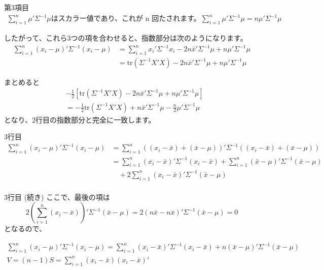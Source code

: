 \documentclass{beamer}
\begin{document}
\begin{frame}{第3項目}
\begin{align*}
\sum_{i=1}^n \mu'\Sigma^{-1}\mu\text{はスカラー値であり、これが n 回たされます。}
\sum_{i=1}^n \mu'\Sigma^{-1}\mu 
= n\mu'\Sigma^{-1}\mu
\end{align*}

したがって、これら3つの項を合わせると、指数部分は次のようになります。
\begin{align*}
\sum_{i=1}^n (x_i - \mu)'\Sigma^{-1}(x_i - \mu)
&= \sum_{i=1}^n x_i'\Sigma^{-1}x_i - 2n\bar{x}'\Sigma^{-1}\mu + n\mu'\Sigma^{-1}\mu \\
&= \mathrm{tr}(\Sigma^{-1} X'X) - 2n\bar{x}'\Sigma^{-1}\mu + n\mu'\Sigma^{-1}\mu
\end{align*}

\end{frame}

\begin{frame}{まとめると}
    \begin{align*}
    & -\frac{1}{2} \left[ \mathrm{tr}(\Sigma^{-1} X'X) - 2n\bar{x}'\Sigma^{-1}\mu + n\mu'\Sigma^{-1}\mu \right] \\
    &= -\frac{1}{2} \mathrm{tr}(\Sigma^{-1} X'X) + n\bar{x}'\Sigma^{-1}\mu - \frac{n}{2} \mu'\Sigma^{-1}\mu
    \end{align*}
    となり、2行目の指数部分と完全に一致します。
\end{frame}

\begin{frame}{3行目}
\begin{align*}
\sum_{i=1}^n (x_i - \mu)' \Sigma^{-1} (x_i - \mu)
&= \sum_{i=1}^n \left( (x_i - \bar{x}) + (\bar{x} - \mu) \right)' \Sigma^{-1} \left( (x_i - \bar{x}) + (\bar{x} - \mu) \right) \\
&= \sum_{i=1}^n (x_i - \bar{x})' \Sigma^{-1} (x_i - \bar{x}) + \sum_{i=1}^n (\bar{x} - \mu)' \Sigma^{-1} (\bar{x} - \mu) \\
&\quad + 2\sum_{i=1}^n (x_i - \bar{x})' \Sigma^{-1} (\bar{x} - \mu)\\
\end{align*}
\end{frame}

\begin{frame}{3行目 (続き)}
ここで、最後の項は
\[
2\left(\sum_{i=1}^n (x_i - \bar{x})\right)' \Sigma^{-1} (\bar{x} - \mu) = 2(n\bar{x} - n\bar{x})' \Sigma^{-1} (\bar{x} - \mu) = 0
\]
となるので、

\begin{align*}
\sum_{i=1}^n (x_i - \mu)' \Sigma^{-1} (x_i - \mu)
= \sum_{i=1}^n (x_i - \bar{x})' \Sigma^{-1} (x_i - \bar{x}) + n(\bar{x} - \mu)' \Sigma^{-1} (\bar{x} - \mu)\\
V = (n-1)S = \sum_{i=1}^n (x_i - \bar{x})(x_i - \bar{x})'
\end{align*}
\end{frame}
\end{document}
